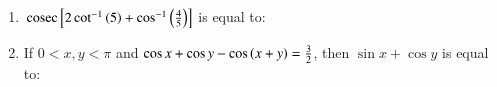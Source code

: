 \documentclass[journal,,12pt,onecolumn]{IEEEtran}
\theoremstyle{remark}
\begin{document}
\begin{enumerate}
\begin{enumerate}
        \end{enumerate}
    \item $\,\text{cosec}\,{\left[2\cot^{-1}{\left(5\right)}+\cos^{-1}{\left(\frac{4}{5}\right)}\right]}$ is equal to:
    \begin{enumerate}
        \end{enumerate}

 
 \item If $0 < x,y < \pi$ and $\cos{x}+\cos{y}-\cos{\ensuremath{\left(x+y\right)}}=\frac{3}{2}$, then $\sin{x}+\cos{y}$ is equal to:
 \begin{enumerate}
 \end{enumerate}
 \end{enumerate}

 
\end{document}
